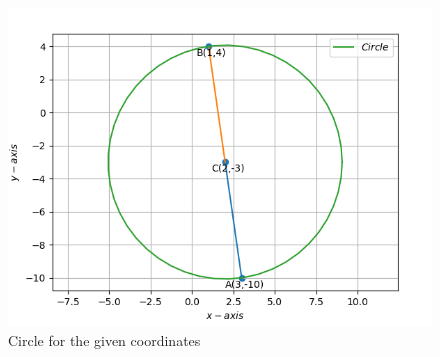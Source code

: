 \documentclass[12pt]{article}
\begin{document}
\begin{enumerate}
\begin{figure}[!h]
\begin{center}
	\includegraphics[width=6in]{Vector1.png}
\end{center}
\caption{Circle for the given coordinates}
\label{fig:Fig}
\end{figure}
\end{enumerate}
\end{document}
